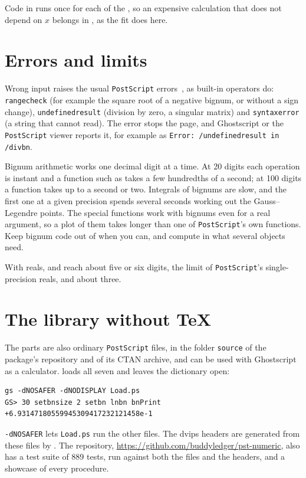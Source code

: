 \documentclass[11pt,english,BCOR=10mm,DIV=12,bibliography=totoc,parskip=false,
   headings=small,headinclude=false,footinclude=false,oneside]{pst-doc}
\DeclareRobustCommand\PS{\texttt{PostScript}\xspace}
\begin{document}
Code in  runs once for each of the , so an
expensive calculation that does not depend on $x$ belongs in ,
as the fit does here.


\section{Errors and limits}

Wrong input raises the usual \PS errors~\cite{PLRM}, as built-in operators
do: \texttt{rangecheck} (for example the square root of a negative bignum,
or  without a sign change), \texttt{undefinedresult} (division by
zero, a singular matrix) and \texttt{syntaxerror} (a string that
 cannot read). The error stops the page, and Ghostscript or the
\PS viewer reports it, for example as
\texttt{Error: /undefinedresult in /divbn}.

Bignum arithmetic works one decimal digit at a time. At 20 digits each
operation is instant and a function such as  takes a few
hundredths of a second; at 100 digits a function takes up to a second or two.
Integrals of bignums are slow, and the first one at a given precision spends
several seconds working out the Gauss--Legendre points. The special functions
work with bignums even for a real argument, so a plot of them takes longer
than one of \PS's own functions. Keep bignum code out of  when
you can, and compute in  what several objects need.

With reals,  and  reach about five or six digits,
the limit of \PS's single-precision reals, and  about three.


\section{The library without \TeX}

The parts are also ordinary \PS files, in the folder \texttt{source} of the
package's repository and of its CTAN archive, and can be used with
Ghostscript as a calculator.  loads all seven and leaves the
dictionary open:

\begin{verbatim}
gs -dNOSAFER -dNODISPLAY Load.ps
GS> 30 setbnsize 2 setbn lnbn bnPrint
+6.93147180559945309417232121458e-1
\end{verbatim}

\texttt{-dNOSAFER} lets \texttt{Load.ps} run the other files. The dvips
headers are generated from these files by . The
repository, \url{https://github.com/buddyledger/pst-numeric}, also has a
test suite of 889 tests, run against both the files and the headers, and a
showcase of every procedure.
\end{document}
